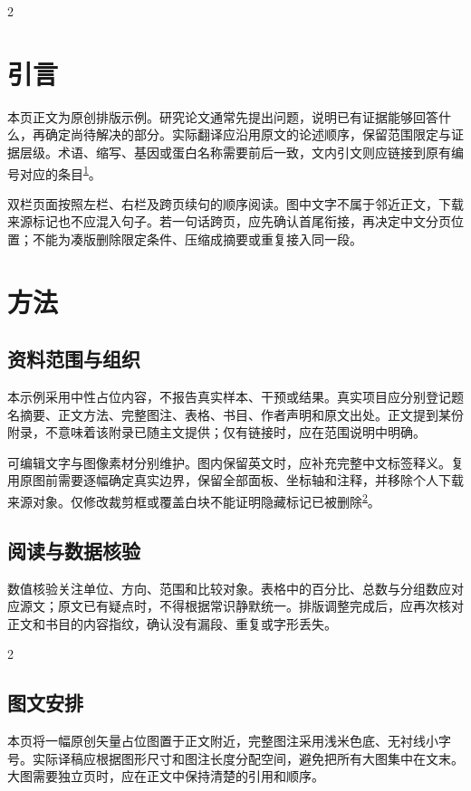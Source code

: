 \documentclass[UTF8,fontset=none,scheme=plain]{ctexart}
\newcommand{\SampleCiteOne}{\textsuperscript{\hyperlink{ref:1}{1}}}\newcommand{\SampleCiteTwo}{\textsuperscript{\hyperlink{ref:2}{2}}}
\newcommand{\CaptionBox}[1]{\par\noindent\begingroup\setlength{\fboxsep}{7bp}\colorbox{NEJMCaption}{\begin{minipage}{\dimexpr\linewidth-14bp}\sffamily\fontsize{7.6bp}{9.2bp}\selectfont #1\par\end{minipage}}\endgroup\par}
\begin{document}
\begin{multicols}{2}
\section*{引言}
本页正文为原创排版示例。研究论文通常先提出问题，说明已有证据能够回答什么，再确定尚待解决的部分。实际翻译应沿用原文的论述顺序，保留范围限定与证据层级。术语、缩写、基因或蛋白名称需要前后一致，文内引文则应链接到原有编号对应的条目\SampleCiteOne。

双栏页面按照左栏、右栏及跨页续句的顺序阅读。图中文字不属于邻近正文，下载来源标记也不应混入句子。若一句话跨页，应先确认首尾衔接，再决定中文分页位置；不能为凑版删除限定条件、压缩成摘要或重复接入同一段。
\section*{方法}
\subsection*{资料范围与组织}
本示例采用中性占位内容，不报告真实样本、干预或结果。真实项目应分别登记题名摘要、正文方法、完整图注、表格、书目、作者声明和原文出处。正文提到某份附录，不意味着该附录已随主文提供；仅有链接时，应在范围说明中明确。

可编辑文字与图像素材分别维护。图内保留英文时，应补充完整中文标签释义。复用原图前需要逐幅确定真实边界，保留全部面板、坐标轴和注释，并移除个人下载来源对象。仅修改裁剪框或覆盖白块不能证明隐藏标记已被删除\SampleCiteTwo。
\subsection*{阅读与数据核验}
数值核验关注单位、方向、范围和比较对象。表格中的百分比、总数与分组数应对应源文；原文已有疑点时，不得根据常识静默统一。排版调整完成后，应再次核对正文和书目的内容指纹，确认没有漏段、重复或字形丢失。
\end{multicols}
\vspace{5bp}\noindent\begin{minipage}{\linewidth}\centering\begin{minipage}{.82\linewidth}\DemoVector\end{minipage}\par\vspace{5bp}\CaptionBox{\DemoCaption}\end{minipage}
\begin{multicols}{2}
\subsection*{图文安排}
本页将一幅原创矢量占位图置于正文附近，完整图注采用浅米色底、无衬线小字号。实际译稿应根据图形尺寸和图注长度分配空间，避免把所有大图集中在文末。大图需要独立页时，应在正文中保持清楚的引用和顺序。
\end{multicols}
\end{document}

